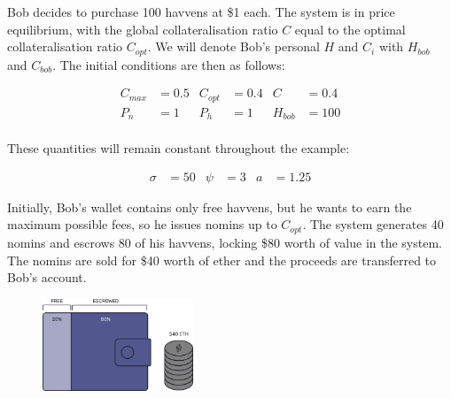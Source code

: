 \noindent Bob decides to purchase 100 havvens at \$1 each.
The system is in price equilibrium, with the global collateralisation
ratio \(C\) equal to the optimal collateralisation ratio
\(C_{opt}\). We will denote Bob's personal \(H\) and \(C_i\) with
\(H_{bob}\) and \(C_{bob}\). The initial conditions are then as follows:

\begin{align*}
    C_{max} &= 0.5 & C_{opt} &= 0.4 & C &= 0.4 \\
    P_n &= 1 & P_h &= 1 & H_{bob} &= 100 \\
\end{align*}

\noindent These quantities will remain constant throughout the example:

\begin{align*}
    \sigma &= 50 & \psi &= 3 & a&= 1.25
\end{align*}

\vspace{4mm}

\noindent Initially, Bob's wallet contains only free havvens, but he wants to
earn the maximum possible fees, so he issues nomins up to \(C_{opt}\).
The system generates 40 nomins and escrows 80 of his havvens,
locking \$80 worth of value in the system. The nomins are sold for \$40 worth
of ether and the proceeds are transferred to Bob's account.


\begin{figure}[h!]
    \centering
    \includegraphics[width=0.40\textwidth]{img/escrowed}
\end{figure}

